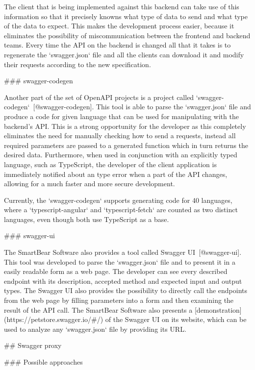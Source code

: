 \documentclass[
  digital, %
  oneside, %
  lof,     %
  lot,     %
]{fithesis4}
\begin{document}
The client that is being implemented against this backend can take use of this information so that it precisely knowns what type of data to send and what type of the data to expect. This makes the development process easier, because it eliminates the possibility of miscommunication between the frontend and backend teams. Every time the API on the backend is changed all that it takes is to regenerate the `swagger.json` file and all the clients can download it and modify their requests according to the new specification.

### swagger-codegen
\label{chap:swagger-codegen}

Another part of the set of OpenAPI projects is a project called `swagger-codegen`~[@swagger-codegen]. This tool is able to parse the `swagger.json` file and produce a code for given language that can be used for manipulating with the backend's API. This is a strong opportunity for the developer as this completely eliminates the need for manually checking how to send a requests, instead all required parameters are passed to a generated function which in turn returns the desired data. Furthermore, when used in conjunction with an explicitly typed language, such as TypeScript, the developer of the client application is immediately notified about an type error when a part of the API changes, allowing for a much faster and more secure development.

Currently, the `swagger-codegen` supports generating code for 40 languages, where a `typescript-angular` and `typescript-fetch` are counted as two distinct languages, even though both use TypeScript as a base.

### swagger-ui

The SmartBear Software also provides a tool called Swagger UI~[@swagger-ui]. This tool was developed to parse the `swagger.json` file and to present it in a easily readable form as a web page. The developer can see every described endpoint with its description, accepted method and expected input and output types. The Swagger UI also provides the possibility to directly call the endpoints from the web page by filling parameters into a form and then examining the result of the API call. The SmartBear Software also presents a [demonstration](https://petstore.swagger.io/#/) of the Swagger UI on its website, which can be used to analyze any `swagger.json` file by providing its URL.

## Swagger proxy

### Possible approaches
\end{document}
